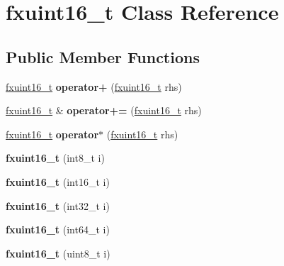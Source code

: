\hypertarget{classfxuint16__t}{}\section{fxuint16\+\_\+t Class Reference}
\label{classfxuint16__t}
\subsection*{Public Member Functions}
\begin{DoxyCompactItemize}
\item 
\hyperlink{classfxuint16__t}{fxuint16\+\_\+t} {\bfseries operator+} (\hyperlink{classfxuint16__t}{fxuint16\+\_\+t} rhs)\hypertarget{classfxuint16__t_a3e179129e96745cfbdab6280ac04927b}{}\label{classfxuint16__t_a3e179129e96745cfbdab6280ac04927b}

\item 
\hyperlink{classfxuint16__t}{fxuint16\+\_\+t} \& {\bfseries operator+=} (\hyperlink{classfxuint16__t}{fxuint16\+\_\+t} rhs)\hypertarget{classfxuint16__t_a0cd28362b617cace07fa4f34d38c83ea}{}\label{classfxuint16__t_a0cd28362b617cace07fa4f34d38c83ea}

\item 
\hyperlink{classfxuint16__t}{fxuint16\+\_\+t} {\bfseries operator$\ast$} (\hyperlink{classfxuint16__t}{fxuint16\+\_\+t} rhs)\hypertarget{classfxuint16__t_a134fd0ce53e389c77d647462683acdd0}{}\label{classfxuint16__t_a134fd0ce53e389c77d647462683acdd0}

\item 
{\bfseries fxuint16\+\_\+t} (int8\+\_\+t i)\hypertarget{classfxuint16__t_aa4d790e7c6ca874b3a3326c59e3d3c39}{}\label{classfxuint16__t_aa4d790e7c6ca874b3a3326c59e3d3c39}

\item 
{\bfseries fxuint16\+\_\+t} (int16\+\_\+t i)\hypertarget{classfxuint16__t_adf4f77b60411a61ce7e447fea952b6b1}{}\label{classfxuint16__t_adf4f77b60411a61ce7e447fea952b6b1}

\item 
{\bfseries fxuint16\+\_\+t} (int32\+\_\+t i)\hypertarget{classfxuint16__t_a4393c70e584eb048a83918768a8143d1}{}\label{classfxuint16__t_a4393c70e584eb048a83918768a8143d1}

\item 
{\bfseries fxuint16\+\_\+t} (int64\+\_\+t i)\hypertarget{classfxuint16__t_a68b569bd7ce976c04f3cd85d6b46e006}{}\label{classfxuint16__t_a68b569bd7ce976c04f3cd85d6b46e006}

\item 
{\bfseries fxuint16\+\_\+t} (uint8\+\_\+t i)\hypertarget{classfxuint16__t_a270d0e69367c74a826d038a8afd06e7b}{}\label{classfxuint16__t_a270d0e69367c74a826d038a8afd06e7b}


\end{DoxyCompactItemize}
